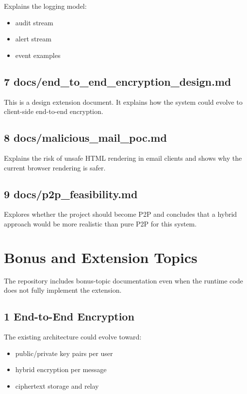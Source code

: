 \documentclass[11pt,a4paper]{article}
\begin{document}
Explains the logging model:

\begin{itemize}
\item audit stream
\item alert stream
\item event examples
\end{itemize}

\subsection{7 docs/end\_to\_end\_encryption\_design.md}

This is a design extension document. It explains how the system could evolve to client-side end-to-end encryption.

\subsection{8 docs/malicious\_mail\_poc.md}

Explains the risk of unsafe HTML rendering in email clients and shows why the current browser rendering is safer.

\subsection{9 docs/p2p\_feasibility.md}

Explores whether the project should become P2P and concludes that a hybrid approach would be more realistic than pure P2P for this system.


\section{Bonus and Extension Topics}

The repository includes bonus-topic documentation even when the runtime code does not fully implement the extension.

\subsection{1 End-to-End Encryption}

The existing architecture could evolve toward:

\begin{itemize}
\item public/private key pairs per user
\item hybrid encryption per message
\item ciphertext storage and relay
\end{itemize}
\end{document}

